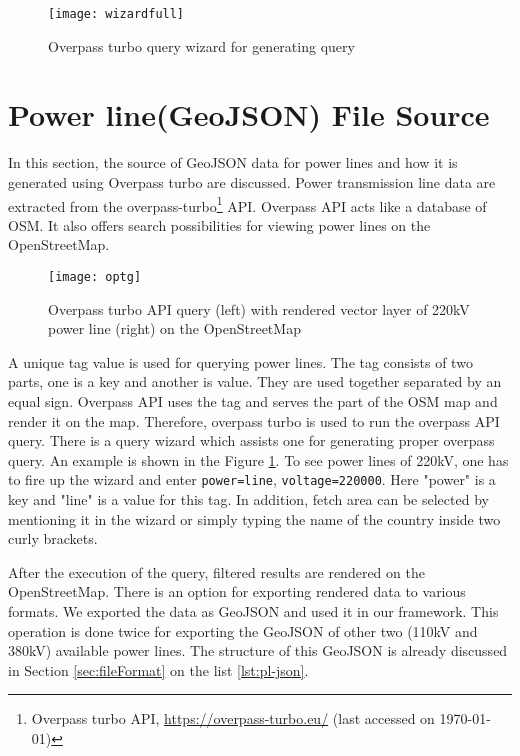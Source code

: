 \begin{figure} [H]
  \begin{center}
    \texttt{[image: wizardfull]}
    \caption{Overpass turbo query wizard for generating query}
    \label{fig:wizard}
  \end{center}
\end{figure}

\section{Power line(GeoJSON) File Source}
\label{sec:plsource}

In this section, the source of GeoJSON data for power lines and how it is generated using Overpass turbo are discussed.
Power transmission line data are extracted from the overpass-turbo\footnote{Overpass turbo API, \url{https://overpass-turbo.eu/} (last accessed on {\today})} API. Overpass API acts like a database of OSM. It also offers search possibilities for viewing power lines on the OpenStreetMap. 

\begin{figure}
  \begin{center}
    \texttt{[image: optg]}
    \caption[Overpass turbo API]{Overpass turbo API query (left) with rendered vector layer of 220kV power line (right) on the OpenStreetMap}
    \label{fig:optg}
  \end{center}
\end{figure} 

A unique tag value is used for querying power lines. The tag consists of two parts, one is a key and another is value. They are used together separated by an equal sign. Overpass API uses the tag and serves the part of the OSM map and render it on the map. Therefore, overpass turbo is used to run the overpass API query. There is a query wizard which assists one for generating proper overpass query. An example is shown in the Figure \ref{fig:wizard}. To see power lines of 220kV, one has to fire up the wizard and enter \texttt{power=line}, \texttt{voltage=220000}. Here "power" is a key and "line" is a value for this tag. In addition, fetch area can be selected by mentioning it in the wizard or simply typing the name of the country inside two curly brackets.
  
After the execution of the query, filtered results are rendered on the OpenStreetMap. There is an option for exporting rendered data to various formats. We exported the data as GeoJSON and used it in our framework. This operation is done twice for exporting the GeoJSON of other two (110kV and 380kV) available power lines. The structure of this GeoJSON is already discussed in Section \ref{sec:fileFormat} on the list \ref{lst:pl-json}.

 